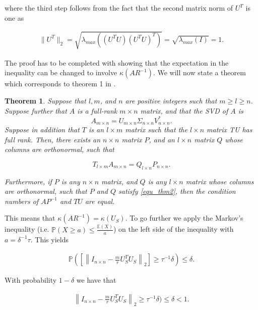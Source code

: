 \documentclass{article}
\newtheorem{theorem}{Theorem}
\begin{document}
where the third step follows from the fact that the second matrix norm of $U^T$
is one as 

\begin{align*}
	\|U^T\|_{2} = \sqrt{\lambda_{max}((U^TU)(U^TU)^T)} = \sqrt{\lambda_{max}(I)} = 1.
\end{align*}

The proof has to be completed with showing that the expectation in the
inequality can be changed to involve $\kappa(AR^{-1})$. We will now state a
theorem which corresponds to theorem 1 in \cite{CUR}.

\begin{theorem} \label{thm_3}
Suppose that $l, m$, and $n$ are positive integers such that $m \geq l \geq n$.
Suppose further that $A$ is a full-rank $m \times n$ matrix, and that the SVD
of $A$ is
$$
A_{m \times n}=U_{m \times n} \Sigma_{n \times n} V_{n \times n}^{*} .
$$
Suppose in addition that $T$ is an $l \times m$ matrix such that the $l \times
n$ matrix TU has full rank.
Then, there exists an $n \times n$ matrix $P$, and an $l \times n$ matrix $Q$
whose columns are orthonormal, such that

\begin{equation} \label{equ_thm2}
	T_{l \times m} A_{m \times n}=Q_{l \times n} P_{n \times n} .
\end{equation}

Furthermore, if $P$ is any $n \times n$ matrix, and $Q$ is any $l \times n$
matrix whose columns are orthonormal, such that $P$ and $Q$ satisfy \ref{equ_thm2},
then the condition numbers of $A P^{-1}$ and $T U$ are equal.
\end{theorem}

This means that $\kappa(AR^{-1}) = \kappa(U_{S})$. To go further we apply the
Markov's inequality (i.e. $\mathbb{P} (X \geq a) \leq \frac{\mathbb{E}(X)}{a}$)
on the left side of the inequality with $a = \delta^{-1} \tau$. This
yields

\begin{align*}
	\mathbb{P}(\left[\left\|I_{n \times n}-\frac{m}{r}U_{S}^TU_{S}\right\|_2\right]
	\geq \tau^{-1}\delta) \leq \delta .
\end{align*}

With probability $1- \delta$ we have that

\begin{align*}
	\left\|I_{n \times n}-\frac{m}{r}U_{S}^TU_{S}\right\|_2
	\geq \tau^{-1}\delta) \leq \delta < 1 .
\end{align*}
\end{document}
